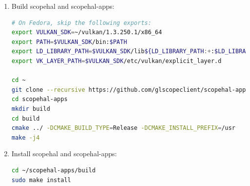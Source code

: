 \begin{enumerate}
\item Build scopehal and scopehal-apps:

\begin{lstlisting}[language=sh, numbers=none]
# On Fedora, skip the following exports:
export VULKAN_SDK=~/vulkan/1.3.250.1/x86_64
export PATH=$VULKAN_SDK/bin:$PATH
export LD_LIBRARY_PATH=$VULKAN_SDK/lib${LD_LIBRARY_PATH:+:$LD_LIBRARY_PATH}
export VK_LAYER_PATH=$VULKAN_SDK/etc/vulkan/explicit_layer.d

cd ~
git clone --recursive https://github.com/glscopeclient/scopehal-apps.git
cd scopehal-apps
mkdir build
cd build
cmake ../ -DCMAKE_BUILD_TYPE=Release -DCMAKE_INSTALL_PREFIX=/usr
make -j4
\end{lstlisting}

\item Install scopehal and scopehal-apps:

\begin{lstlisting}[language=sh, numbers=none]
cd ~/scopehal-apps/build
sudo make install
\end{lstlisting}

\end{enumerate}

